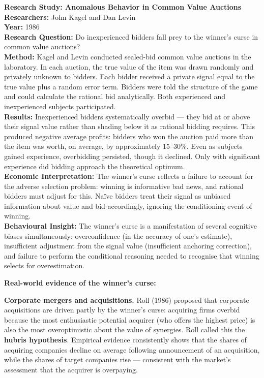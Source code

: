 \documentclass[12pt, letterpaper]{article}
\begin{document}
\begin{researchbox}
\textbf{Research Study: Anomalous Behavior in Common Value Auctions}\\[4pt]

\textbf{Researchers:} John Kagel and Dan Levin\\[4pt]
\textbf{Year:} 1986\\[4pt]
\textbf{Research Question:} Do inexperienced bidders fall prey to the winner's curse in common value auctions?\\[4pt]
\textbf{Method:} Kagel and Levin conducted sealed-bid common value auctions in the laboratory. In each auction, the true value of the item was drawn randomly and privately unknown to bidders. Each bidder received a private signal equal to the true value plus a random error term. Bidders were told the structure of the game and could calculate the rational bid analytically. Both experienced and inexperienced subjects participated.\\[4pt]
\textbf{Results:} Inexperienced bidders systematically overbid --- they bid at or above their signal value rather than shading below it as rational bidding requires. This produced negative average profits: bidders who won the auction paid more than the item was worth, on average, by approximately 15--30\%. Even as subjects gained experience, overbidding persisted, though it declined. Only with significant experience did bidding approach the theoretical optimum.\\[4pt]
\textbf{Economic Interpretation:} The winner's curse reflects a failure to account for the adverse selection problem: winning is informative bad news, and rational bidders must adjust for this. Naïve bidders treat their signal as unbiased information about value and bid accordingly, ignoring the conditioning event of winning.\\[4pt]
\textbf{Behavioural Insight:} The winner's curse is a manifestation of several cognitive biases simultaneously: overconfidence (in the accuracy of one's estimate), insufficient adjustment from the signal value (insufficient anchoring correction), and failure to perform the conditional reasoning needed to recognise that winning selects for overestimation.\\[4pt]
\end{researchbox}

\textbf{Real-world evidence of the winner's curse:}

\textbf{Corporate mergers and acquisitions.} Roll (1986) proposed that corporate acquisitions are driven partly by the winner's curse: acquiring firms overbid because the most enthusiastic potential acquirer (who offers the highest price) is also the most overoptimistic about the value of synergies. Roll called this the \textbf{hubris hypothesis}. Empirical evidence consistently shows that the shares of acquiring companies decline on average following announcement of an acquisition, while the shares of target companies rise --- consistent with the market's assessment that the acquirer is overpaying.
\end{document}
